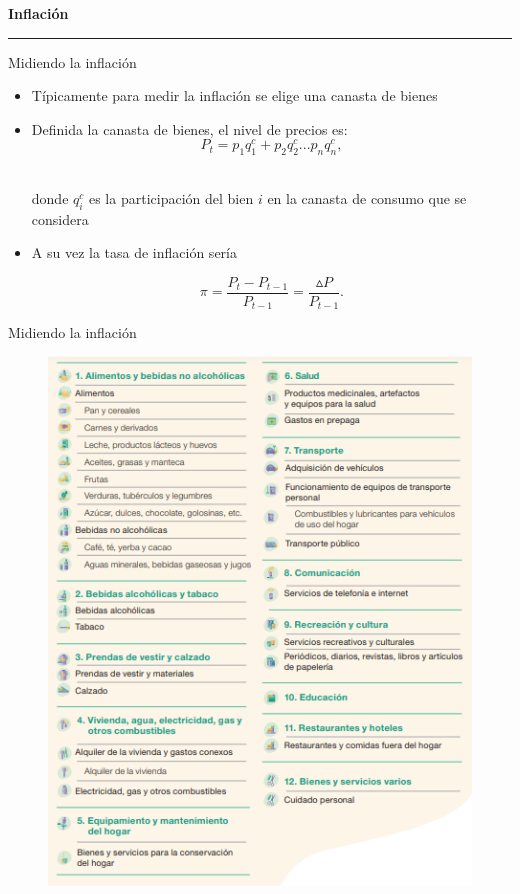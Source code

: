 \documentclass{beamer}
\begin{document}
\begin{frame}{}
\centering\huge\textbf{Inflación} 
\vspace{2mm}
\hrule
\end{frame}

\begin{frame}{Midiendo la inflación}
\begin{itemize}    
    \item Típicamente para medir la inflación se elige una canasta de bienes \vspace{1mm}
    \item Definida la canasta de bienes, el nivel de precios es: 
        \begin{equation}
            P_t = p_1 q_1^c+ p_2 q_2^c...p_n q_n^c,
        \end{equation}

    \\ donde $q_i^c$ es la participación del bien $i$ en la canasta de consumo que se considera

    \item A su vez la tasa de inflación sería 

    \begin{equation}
        \pi =\frac{P_t - P_{t-1}}{P_{t-1}}= \frac{\vartriangle P}{P_{t-1}}.
    \end{equation}
\end{itemize}
\end{frame}

\begin{frame}{Midiendo la inflación}
\begin{figure} [H]  \includegraphics[scale=0.4]{Slides Principios de Economia/Figures/Canasta INDEC.png}
\end{figure}
\end{frame}
\end{document}

